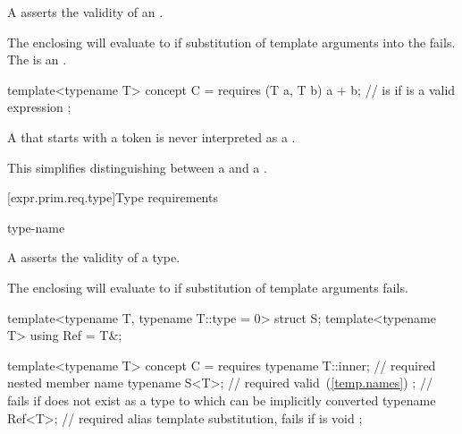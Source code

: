 \pnum
A  asserts
the validity of an .
\begin{note}
The enclosing  will evaluate to 
if substitution of template arguments into the  fails.
The  is an .
\end{note}
\begin{example}
\begin{codeblock}
template<typename T> concept C =
  requires (T a, T b) {
    a + b;          //  is  if  is a valid expression
  };
\end{codeblock}
\end{example}

\pnum
A  that starts with a  token
is never interpreted as a .
\begin{note}
This simplifies distinguishing between a 
and a .
\end{note}

[expr.prim.req.type]{Type requirements}
%

\begin{bnf}
\br
      type-name \terminal{;}
\end{bnf}

\pnum
A  asserts the validity of a type.
\begin{note}
The enclosing  will evaluate to 
if substitution of template arguments fails.
\end{note}
\begin{example}
\begin{codeblock}
template<typename T, typename T::type = 0> struct S;
template<typename T> using Ref = T&;

template<typename T> concept C = requires {
  typename T::inner;    // required nested member name
  typename S<T>;        // required valid~(\ref{temp.names}) ;
                        // fails if  does not exist as a type to which  can be implicitly converted
  typename Ref<T>;      // required alias template substitution, fails if  is void
};
\end{codeblock}
\end{example}

